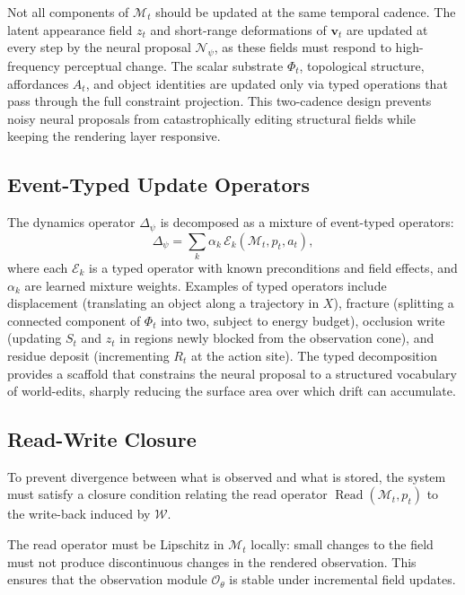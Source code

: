\documentclass[11pt]{article}
\begin{document}
Not all components of $\mathcal{M}_t$ should be updated at the same
temporal cadence.
The latent appearance field $z_t$ and short-range deformations of
$\mathbf{v}_t$ are updated at every step by the neural proposal
$\mathcal{N}_\psi$, as these fields must respond to high-frequency
perceptual change.
The scalar substrate $\Phi_t$, topological structure, affordances $A_t$,
and object identities are updated only via typed operations that pass
through the full constraint projection.
This two-cadence design prevents noisy neural proposals from catastrophically
editing structural fields while keeping the rendering layer responsive.

\subsection{Event-Typed Update Operators}

The dynamics operator $\Delta_\psi$ is decomposed as a mixture of
event-typed operators:
\[
\Delta_\psi
=
\sum_k \alpha_k\, \mathcal{E}_k(\mathcal{M}_t, p_t, a_t),
\]
where each $\mathcal{E}_k$ is a typed operator with known preconditions
and field effects, and $\alpha_k$ are learned mixture weights.
Examples of typed operators include displacement (translating an object
along a trajectory in $X$), fracture (splitting a connected component of
$\Phi_t$ into two, subject to energy budget), occlusion write (updating
$S_t$ and $z_t$ in regions newly blocked from the observation cone), and
residue deposit (incrementing $R_t$ at the action site).
The typed decomposition provides a scaffold that constrains the neural
proposal to a structured vocabulary of world-edits, sharply reducing the
surface area over which drift can accumulate.

\subsection{Read-Write Closure}

To prevent divergence between what is observed and what is stored, the
system must satisfy a closure condition relating the read operator
$\operatorname{Read}(\mathcal{M}_t, p_t)$ to the write-back induced by
$\mathcal{W}$.

The read operator must be Lipschitz in $\mathcal{M}_t$ locally: small
changes to the field must not produce discontinuous changes in the
rendered observation.
This ensures that the observation module $\mathcal{O}_\theta$ is
stable under incremental field updates.
\end{document}
